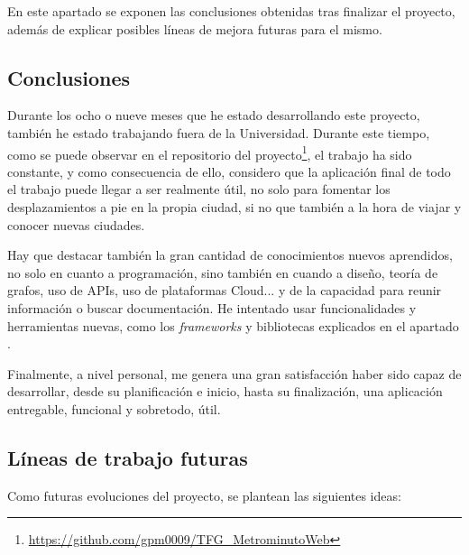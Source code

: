 
En este apartado se exponen las conclusiones obtenidas tras finalizar el proyecto, además de explicar posibles líneas de mejora futuras para el mismo.

\subsection{Conclusiones}
Durante los ocho o nueve meses que he estado desarrollando este proyecto, también he estado trabajando fuera de la Universidad. Durante este tiempo, como se puede observar en el repositorio del proyecto\footnote{\url{https://github.com/gpm0009/TFG_MetrominutoWeb}}, el trabajo ha sido constante, y como consecuencia de ello, considero que la aplicación final de todo el trabajo puede llegar a ser realmente útil, no solo para fomentar los desplazamientos a pie en la propia ciudad, si no que también a la hora de viajar y conocer nuevas ciudades.


Hay que destacar también la gran cantidad de conocimientos nuevos aprendidos, no solo en cuanto a programación, sino también en cuando a diseño, teoría de grafos, uso de APIs, uso de plataformas Cloud... y de la capacidad para reunir información o buscar documentación. He intentado usar funcionalidades y herramientas nuevas, como los \emph{frameworks} y bibliotecas explicados en el apartado .


Finalmente, a nivel personal, me genera una gran satisfacción haber sido capaz de desarrollar, desde su planificación e inicio, hasta su finalización, una aplicación entregable, funcional y sobretodo, útil.


\subsection{Líneas de trabajo futuras}\label{futuras}
Como futuras evoluciones del proyecto, se plantean las siguientes ideas:

